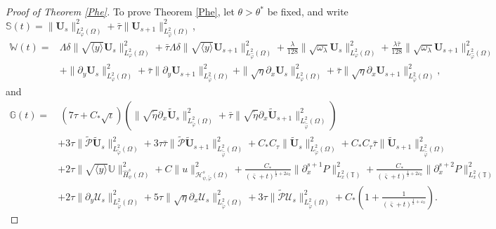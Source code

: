 \documentclass{amsart}
\numberwithin{equation}{section}
\newcommand\y{{{\langle y \rangle}}}
\begin{document}
\begin{proof}[Proof of Theorem \ref{Phe}]
To prove Theorem \ref{Phe}, let $\theta>\theta^{*}$ be fixed, and write
$\mathbb{S}(t)=\|\mathbf{U}_{s}\|_{L_{\varphi}^{2}(\Omega)}^{2}+\bar{\tau}\|\mathbf{U}_{s+1}\|_{L_{\hat{\varphi}}^{2}(\Omega)}^{2}$,
\begin{align*}
\mathbb{W}(t)
=&\Lambda\delta\|\sqrt{\y}\mathbf{U}_{s}\|_{L_{\varphi}^{2}(\Omega)}^{2}
 +\bar{\tau}\Lambda\delta\|\sqrt{\y}\mathbf{U}_{s+1}\|_{L_{\hat{\varphi}}^{2}(\Omega)}^{2}
 +\frac{\lambda}{128}\|\sqrt{\omega_{\lambda}}\mathbf{U}_{s}\|_{L_{\varphi}^{2}(\Omega)}^{2}
 +\frac{\lambda\bar{\tau}}{128}\|\sqrt{\omega_{\lambda}}\mathbf{U}_{s+1}\|_{L_{\hat{\varphi}}^{2}(\Omega)}^{2}\\
&+\|\partial_{y}\mathbf{U}_{s}\|_{L_{\varphi}^{2}(\Omega)}^{2}
 +\bar{\tau}\|\partial_{y}\mathbf{U}_{s+1}\|_{L_{\hat{\varphi}}^{2}(\Omega)}^{2}
 +\|\sqrt{\eta}\partial_{x}\mathbf{U}_{s}\|_{L_{\varphi}^{2}(\Omega)}^{2}
 +\bar{\tau}\|\sqrt{\eta}\partial_{x}\mathbf{U}_{s+1}\|_{L_{\hat{\varphi}}^{2}(\Omega)}^{2},
\end{align*}
and
\begin{align*}
\mathbb{G}(t)
=&~(7\tau+C_{*}\sqrt{\iota})\left(\|\sqrt{\tilde{\eta}}\partial_{x}\tilde{\mathbf{U}}_{s}\|_{L_{\tilde{\varphi}}^{2}(\Omega)}^{2}
                                     +\bar{\tau}\|\sqrt{\tilde{\eta}}\partial_{x}\tilde{\mathbf{U}}_{s+1}\|_{L_{\tilde{\hat{\varphi}}}^{2}(\Omega)}^{2}\right)\\
 &+3\tau\|\tilde{\mathcal{P}}\tilde{\mathbf{U}}_{s}\|_{L_{\tilde{\varphi}}^{2}(\Omega)}^{2}
  +3\tau\bar{\tau}\|\tilde{\mathcal{P}}\tilde{\mathbf{U}}_{s+1}\|_{L_{\tilde{\hat{\varphi}}}^{2}(\Omega)}^{2}
  +C_{*}C_{\tau}\|\tilde{\mathbf{U}}_{s}\|_{L_{\tilde{\varphi}}^{2}(\Omega)}^{2}
  +C_{*}C_{\tau}\bar{\tau}\|\tilde{\mathbf{U}}_{s+1}\|_{L_{\tilde{\hat{\varphi}}}^{2}(\Omega)}^{2}\nonumber\\
 &+2\tau\|\sqrt{\y}\mathbb{U}\|_{\hat{H}_{\psi}^{s}(\Omega)}^{2}
  +C\|u\|_{\mathcal{H}_{\psi,\tilde{\varphi}}^{s}(\Omega)}^{2}
  +\frac{C_{*}}{(\bar{\varsigma}+t)^{\frac{1}{2}+2\varepsilon_{0}}}\|\partial_{x}^{s+1}P\|_{L_{x}^{2}(\mathbb{T})}^{2}
  +\frac{C_{*}}{(\bar{\varsigma}+t)^{\frac{1}{2}+2\varepsilon_{0}}}\|\partial_{x}^{s+2}P\|_{L_{x}^{2}(\mathbb{T})}^{2}\nonumber\\
 &+2\tau\|\partial_{y}\mathcal{U}_{s}\|_{L_{\tilde{\varphi}}^{2}(\Omega)}^{2}
  +5\tau\|\sqrt{\eta}\partial_{x}\mathcal{U}_{s}\|_{L_{\tilde{\varphi}}^{2}(\Omega)}^{2}
  +3\tau\|\tilde{\mathcal{P}}\mathcal{U}_{s}\|_{L_{\tilde{\varphi}}^{2}(\Omega)}^{2}
  +C_{*}\left(1+\frac{1}{(\bar{\varsigma}+t)^{\frac{1}{2}+\varepsilon_{0}}}\right).\nonumber
\end{align*}


\end{proof}
\end{document}
